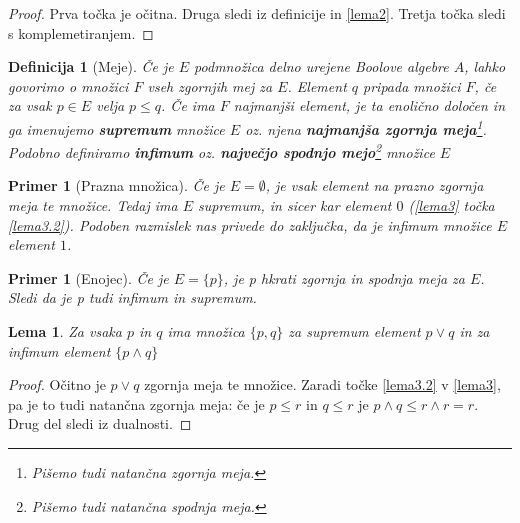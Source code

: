 \documentclass{amsart}
\newtheorem{lema}[izrek]{Lema}
\newtheorem{definicija}[izrek]{Definicija}
\newtheorem{primer}[izrek]{Primer}
\begin{document}
\begin{proof}
    Prva točka je očitna. Druga sledi iz definicije in \ref{lema2}. Tretja točka sledi s komplemetiranjem.

\end{proof}

\begin{definicija}[Meje]
    Če je $E$ podmnožica delno urejene Boolove algebre \(A\), lahko govorimo o množici \(F\) vseh zgornjih mej za \(E\).
    Element \(q\) pripada množici \(F\), če za vsak \(p \in E\) velja \(p \leq q\). Če ima \(F\) najmanjši element, je ta 
    enolično določen in ga imenujemo {\bf supremum} množice \(E\) oz. njena {\bf najmanjša zgornja meja}\footnote{Pišemo tudi natančna zgornja meja.}. Podobno 
    definiramo {\bf infimum} oz. {\bf največjo spodnjo mejo}\footnote{Pišemo tudi natančna spodnja meja.} množice \(E\)
\end{definicija}

\begin{primer}[Prazna množica]
    \label{primer1}
    Če je \(E = \emptyset\), je vsak element na prazno zgornja meja te množice. Tedaj ima \(E\) supremum, in sicer kar element \(0\)
    (\ref{lema3} točka \ref{lema3.2}). 
    Podoben razmislek nas privede do zaključka, da je infimum množice \(E\) element \(1\).
\end{primer}

\begin{primer}[Enojec]
    \label{primer2}
    Če je \(E = \{p\}\), je p hkrati zgornja in spodnja meja za \(E\). Sledi da je p tudi infimum in supremum.
\end{primer}

\begin{lema}
    Za vsaka \(p\) in \(q\) ima množica \(\{p, q\}\) za supremum element \(p \vee q\) in za infimum element \(\{p \wedge q\}\)
\end{lema}

\begin{proof}
    Očitno je \(p \vee q\) zgornja meja te množice. Zaradi točke \ref{lema3.2} v \ref{lema3}, pa je to tudi natančna zgornja meja:
    če je $p \leq r$ in $q \leq r$ je $p \wedge q \leq r \wedge r = r$.
    Drug del sledi iz dualnosti.

\end{proof}
\end{document}
